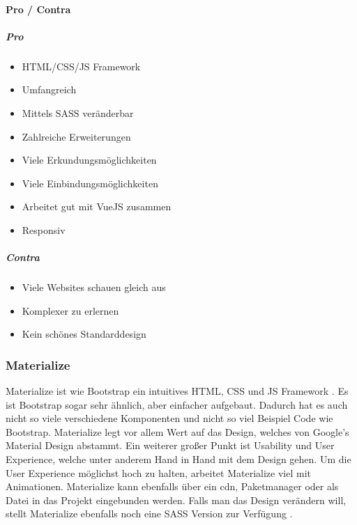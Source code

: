 		\paragraph{Pro / Contra}
		\subparagraph{Pro}
		\begin{itemize}
			\item HTML/CSS/JS Framework
			\item Umfangreich
			\item Mittels SASS veränderbar
			\item Zahlreiche Erweiterungen
			\item Viele Erkundungsmöglichkeiten
			\item Viele Einbindungsmöglichkeiten
			\item Arbeitet gut mit VueJS zusammen
			\item Responsiv
		\end{itemize}
		\subparagraph{Contra}
		\begin{itemize}
			\item Viele Websites schauen gleich aus
			\item Komplexer zu erlernen
			\item Kein schönes Standarddesign
		\end{itemize}
	
		\subsubsection{Materialize}
		Materialize ist wie Bootstrap ein intuitives HTML, CSS und JS Framework \cite{materialize-intro}. Es ist Bootstrap sogar sehr ähnlich, aber einfacher aufgebaut. Dadurch hat es auch nicht so viele verschiedene Komponenten und nicht so viel Beispiel Code wie Bootstrap. Materialize legt vor allem Wert auf das Design, welches von Google's Material Design abstammt. Ein weiterer großer Punkt ist Usability und User Experience, welche unter anderem Hand in Hand mit dem Design gehen. Um die User Experience möglichst hoch zu halten, arbeitet Materialize viel mit Animationen. Materialize kann ebenfalls über ein \Gls{cdn}, Paketmanager oder als Datei in das Projekt eingebunden werden. Falls man das Design verändern will, stellt Materialize ebenfalls noch eine SASS Version zur Verfügung \cite{WebDocMaterialize}.
